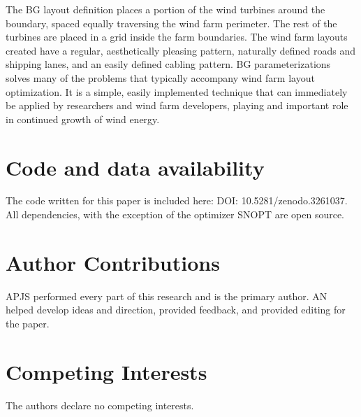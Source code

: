 \documentclass[wes, manuscript]{copernicus}
\begin{document}
The BG layout definition places a portion of the wind turbines around the boundary, spaced equally traversing the wind farm perimeter. The rest of the turbines are placed in a grid inside the farm boundaries. The wind farm layouts created have a regular, aesthetically pleasing pattern, naturally defined roads and shipping lanes, and an easily defined cabling pattern. 
%
BG parameterizations solves many of the problems that typically accompany wind farm layout optimization. It is a simple, easily implemented technique that can immediately be applied by researchers and wind farm developers, playing and important role in continued growth of wind energy.

\section*{Code and data availability}
The code written for this paper is included here: DOI: 10.5281/zenodo.3261037. All dependencies, with the exception of the optimizer SNOPT are open source.

\section*{Author Contributions}
APJS performed every part of this research and is the
primary author. AN helped develop ideas and direction, provided
feedback, and provided editing for the paper.

\section*{Competing Interests}
The authors declare no competing interests.





\end{document}
